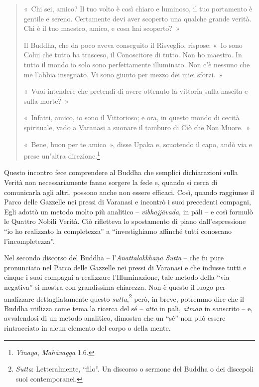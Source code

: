 \begin{quote}
«~Chi sei, amico? Il tuo volto è così chiaro e luminoso, il tuo
portamento è gentile e sereno. Certamente devi aver scoperto una qualche
grande verità. Chi è il tuo maestro, amico, e cosa hai scoperto?~»

Il Buddha, che da poco aveva conseguito il Risveglio, rispose: «~Io sono
Colui che tutto ha trasceso, il Conoscitore di tutto. Non ho maestro. In
tutto il mondo io solo sono perfettamente illuminato. Non c'è nessuno
che me l'abbia insegnato. Vi sono giunto per mezzo dei miei sforzi.~»

«~Vuoi intendere che pretendi di avere ottenuto la vittoria sulla
nascita e sulla morte?~»

«~Infatti, amico, io sono il Vittorioso; e ora, in questo mondo di
cecità spirituale, vado a Varanasi a suonare il tamburo di Ciò che Non
Muore.~»

«~Bene, buon per te amico~», disse Upaka e, scuotendo il capo, andò via e
prese un'altra direzione.\footnote{\emph{Vinaya}, \emph{Mahāvagga} 1.6.}
\end{quote}

Questo incontro fece comprendere al Buddha che semplici dichiarazioni
sulla Verità non necessariamente fanno sorgere la fede e, quando si
cerca di comunicarla agli altri, possono anche non essere efficaci.
Così, quando raggiunse il Parco delle Gazzelle nei pressi di Varanasi e
incontrò i suoi precedenti compagni, Egli adottò un metodo molto più
analitico -- \emph{vibhajjāvada}, in pāli -- e così formulò le Quattro
Nobili Verità. Ciò rifletteva lo spostamento di piano dall'espressione
``io ho realizzato la completezza'' a ``investighiamo affinché tutti
conoscano l'incompletezza''.

Nel secondo discorso del Buddha -- l'\emph{Anattalakkhaṇa Sutta} -- che
fu pure pronunciato nel Parco delle Gazzelle nei pressi di Varanasi e
che indusse tutti e cinque i suoi compagni a realizzare l'Illuminazione,
tale metodo della ``via negativa'' si mostra con grandissima chiarezza.
Non è questo il luogo per analizzare dettagliatamente questo
\emph{sutta},\footnote{\emph{Sutta}: Letteralmente, ``filo''. Un
  discorso o sermone del Buddha o dei discepoli suoi contemporanei.}
però, in breve, potremmo dire che il Buddha utilizza come tema la
ricerca del sé -- \emph{attā} in pāli, \emph{ātman} in sanscrito -- e,
avvalendosi di un metodo analitico, dimostra che un ``sé'' non può
essere rintracciato in alcun elemento del corpo o della mente.

